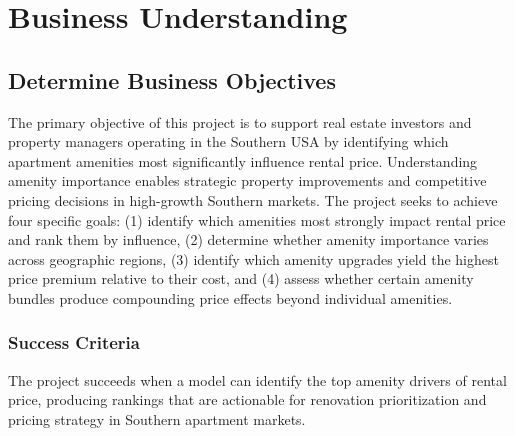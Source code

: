 \section{Business Understanding}
\subsection{Determine Business Objectives}
\noindent
The primary objective of this project is to support real estate investors and property managers operating in the Southern USA by identifying which apartment amenities most significantly influence rental price. Understanding amenity importance enables strategic property improvements and competitive pricing decisions in high-growth Southern markets. The project seeks to achieve four specific goals: (1) identify which amenities most strongly impact rental price and rank them by influence, (2) determine whether amenity importance varies across geographic regions, (3) identify which amenity upgrades yield the highest price premium relative to their cost, and (4) assess whether certain amenity bundles produce compounding price effects beyond individual amenities.

\medskip\noindent
\subsubsection*{Success Criteria}
\noindent
The project succeeds when a model can identify the top amenity drivers of rental price, producing rankings that are actionable for renovation prioritization and pricing strategy in Southern apartment markets.

\medskip\noindent
